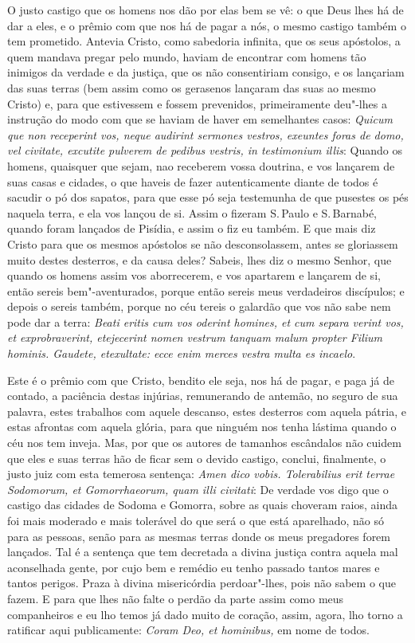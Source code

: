 O justo castigo que os homens nos dão por elas bem se vê: o que Deus
lhes há de dar a eles, e o prêmio com que nos há de pagar a nós, o mesmo
castigo também o tem prometido. Antevia Cristo, como sabedoria infinita,
que os seus apóstolos, a quem mandava pregar pelo mundo, haviam de
encontrar com homens tão inimigos da verdade e da justiça, que os não
consentiriam consigo, e os lançariam das suas terras (bem assim como
os gerasenos lançaram das suas ao mesmo Cristo) e, para que estivessem
e fossem prevenidos, primeiramente deu"-lhes a instrução do modo com que
se haviam de haver em semelhantes casos: \emph{Quicum que non receperint
vos, neque audirint sermones vestros, exeuntes foras de domo, vel
civitate, excutite pulverem de pedibus vestris, in testimonium illis}: Quando os homens, quaisquer que
sejam, nao receberem vossa doutrina, e vos lançarem de suas casas e
cidades, o que haveis de fazer autenticamente diante de todos é sacudir
o pó dos sapatos, para que esse pó seja testemunha de que pusestes os
pés naquela terra, e ela vos lançou de si. Assim o fizeram S.\,Paulo e
S.\,Barnabé, quando foram lançados de Pisídia, e assim o fiz eu também. E
que mais diz Cristo para que os mesmos apóstolos se não desconsolassem,
antes se gloriassem muito destes desterros, e da causa deles?
Sabeis, lhes diz o mesmo Senhor, que quando os homens assim vos
aborrecerem, e vos apartarem e lançarem de si, então sereis
bem"-aventurados, porque então sereis meus verdadeiros discípulos; e
depois o sereis também, porque no céu tereis o galardão que vos não sabe
nem pode dar a terra: \emph{Beati eritis cum vos oderint homines, et cum
separa verint vos, et exprobraverint, etejecerint nomen vestrum tanquam
malum propter Filium hominis. Gaudete, etexultate: ecce enim merces
vestra multa es incaelo}.

Este é o prêmio com que Cristo, bendito ele seja, nos há de pagar, e
paga já de contado, a paciência destas injúrias, remunerando de antemão,
no seguro de sua palavra, estes trabalhos com aquele descanso, estes
desterros com aquela pátria, e estas afrontas com aquela glória, para
que ninguém nos tenha lástima quando o céu nos tem inveja. Mas, por que
os autores de tamanhos escândalos não cuidem que eles e suas terras hão
de ficar sem o devido castigo, conclui, finalmente, o justo juiz com
esta temerosa sentença: \emph{Amen dico vobis. Tolerabilius erit terrae
Sodomorum, et Gomorrhaeorum, quam illi civitati}: De verdade
vos digo que o castigo das cidades de Sodoma e Gomorra, sobre as quais
choveram raios, ainda foi mais moderado e mais tolerável do que será o
que está aparelhado, não só para as pessoas, senão para as mesmas terras
donde os meus pregadores forem lançados. Tal é a sentença que tem
decretada a divina justiça contra aquela mal aconselhada gente, por cujo
bem e remédio eu tenho passado tantos mares e tantos perigos. Praza à
divina misericórdia perdoar"-lhes, pois não sabem o que fazem. E para que
lhes não falte o perdão da parte assim como meus companheiros e eu lho
temos já dado muito de coração, assim, agora, lho torno a ratificar aqui
publicamente: \emph{Coram Deo, et hominibus,} em nome de todos.


